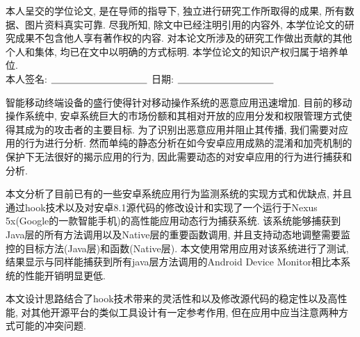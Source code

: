 {%

本人呈交的学位论文, 是在导师的指导下, 独立进行研究工作所取得的成果,
所有数据、图片资料真实可靠. 尽我所知, 除文中已经注明引用的内容外,
本学位论文的研究成果不包含他人享有著作权的内容.
对本论文所涉及的研究工作做出贡献的其他个人和集体,
均已在文中以明确的方式标明. 本学位论文的知识产权归属于培养单位.\\[2cm]

\hspace*{1cm}本人签名: $\underline{\hspace{3.5cm}}$
\hspace{2cm}日期: $\underline{\hspace{3.5cm}}$\hfill\par}
\baselineskip=23pt  %





\begin{cnabstract}
智能移动终端设备的盛行使得针对移动操作系统的恶意应用迅速增加. 目前的移动操作系统中, 安卓系统巨大的市场份额和其相对开放的应用分发和权限管理方式使得其成为的攻击者的主要目标. 为了识别出恶意应用并阻止其传播, 我们需要对应用的行为进行分析. 然而单纯的静态分析在如今安卓应用成熟的混淆和加壳机制的保护下无法很好的揭示应用的行为, 因此需要动态的对安卓应用的行为进行捕获和分析. 

本文分析了目前已有的一些安卓系统应用行为监测系统的实现方式和优缺点, 并且通过hook技术以及对安卓8.1源代码的修改设计和实现了一个运行于Nexus 5x(Google的一款智能手机)的高性能应用动态行为捕获系统. 该系统能够捕获到Java层的所有方法调用以及Native层的重要函数调用, 并且支持动态地调整需要监控的目标方法(Java层)和函数(Native层). 本文使用常用应用对该系统进行了测试, 结果显示与同样能捕获到所有java层方法调用的Android Device Monitor相比本系统的性能开销明显更低.

本文设计思路结合了hook技术带来的灵活性和以及修改源代码的稳定性以及高性能, 对其他开源平台的类似工具设计有一定参考作用, 但在应用中应当注意两种方式可能的冲突问题.




\end{cnabstract}
\par
\vspace*{2em}




